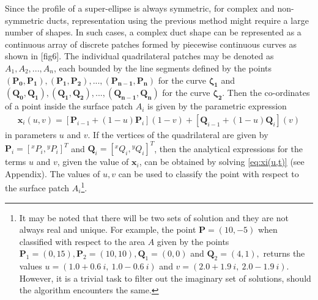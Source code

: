 \documentclass[12pt,a4]{article}
\begin{document}
Since the profile of a super-ellipse is always symmetric, for complex and non-symmetric ducts, representation using the previous method might require a large number of shapes. In such cases, a complex duct shape can be represented as a continuous array of discrete patches formed by piecewise continuous curves as shown in [fig6]. The individual quadrilateral patches may be denoted as $A_1,A_2,...,A_n$, each bounded by the line segments defined by the points $\mathbf{(P_0,P_1),(P_1,P_2),...,(P_{n-1},P_n)}$ for the curve $\mathbf{\zeta_1}$ and $\mathbf{(Q_0,Q_1),(Q_1,Q_2),...,(Q_{n-1},Q_n)}$ for the curve $\mathbf{\zeta_2}$. Then the co-ordinates of a point inside the surface patch $A_i$ is given by the parametric expression
\begin{align}
\label{eq:xi(u,t)}
\mathbf{x}_i(u,v)= \left[ \mathbf{P}_{i-1}+\left(1-{u} \right)\mathbf{P}_i  \right]\left(1-{v}\right) +\left[\mathbf{ Q}_{i-1}+\left(1-{u} \right)\mathbf{Q}_i  \right]\left({v}\right)
\end{align}
in parameters $u$ and $v$. If the vertices of the quadrilateral are given by $\mathbf{P}_{i}=\left[ {}^xP_{i},{}^yP_{i}\right]^T $ and $\mathbf{Q}_{i}=\left[ {}^xQ_{i},{}^yQ_{i}\right]^T $, then the analytical expressions for the terms $u$ and ${v}$, given the value of $\mathbf{x}_i$, can be obtained by solving \ref{eq:xi(u,t)} (see Appendix). The values of $u,v$ can be used to classify the point with respect to the surface patch $A_i$\footnote{It may be noted that there will be two sets of solution and they are not always real and unique. For example, the point $\mathbf{P} =\left(10,-5 \right)$ when classified with respect to the area $A$ given by the points $\mathbf{P}_1 = \left(0,15 \right),\mathbf{P}_2 = \left(10,10 \right),\mathbf{Q}_1 = \left(0,0 \right)$ and $\mathbf{Q}_2 = \left(4,1 \right),$ returns the values $u=\left( 1.0 + 0.6~i,~1.0 - 0.6~i \right)$ and $v=\left(2.0 + 1.9~i,~2.0 - 1.9~i\right)$. However, it is a trivial task to filter out the imaginary set of solutions, should the algorithm encounters the same.}.
\end{document}
